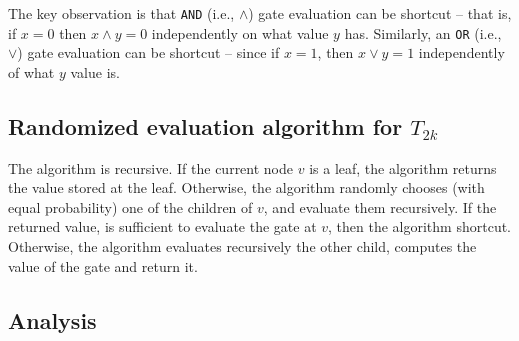 The key observation is that \texttt{AND} (i.e., $\wedge$) gate
evaluation can be shortcut -- that is, if $x=0$ then $x \wedge y = 0$
independently on what value $y$ has. Similarly, an \texttt{OR} (i.e.,
$\vee$) gate evaluation can be shortcut -- since if $x=1$, then
$x\vee y=1$ independently of what $y$ value is.

\subsection{Randomized evaluation algorithm for $T_{2k}$}
The algorithm is recursive. If the current node $v$ is a leaf, the
algorithm returns the value stored at the leaf. Otherwise, the
algorithm randomly chooses (with equal probability) one of the
children of $v$, and evaluate them recursively. If the returned value,
is sufficient to evaluate the gate at $v$, then the algorithm
shortcut. Otherwise, the algorithm evaluates recursively the other
child, computes the value of the gate and return it.

\subsection{Analysis}

